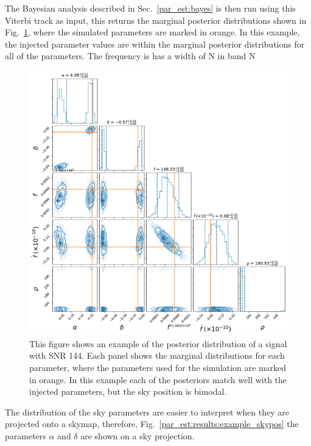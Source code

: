 The Bayesian analysis described in Sec.~\ref{par_est:bayes} is then run using this Viterbi track as input, this returns the marginal posterior distributions shown in Fig.~\ref{par_est:results:example_posterior}, where the simulated parameters are marked in orange.
In this example, the injected parameter values are within the marginal posterior distributions for all of the parameters.
The frequency is has a width of N in band N 
%
\begin{figure}[pt]

    \centering
    \includegraphics[width=\linewidth]{C5_parameter/cornerplot.pdf}
    \caption[KDE of likelihood in different \gls{SNR} ranges]{This figure shows an example of the posterior distribution of a signal with \gls{SNR} 144. Each panel shows the marginal distributions for each parameter, where the parameters used for the simulation are marked in orange. In this example each of the posteriors match well with the injected parameters, but the sky position is bimodal. }
    \label{par_est:results:example_posterior}
    
\end{figure}
%
The distribution of the sky parameters are easier to interpret when they are projected onto a skymap, therefore, Fig.~\ref{par_est:results:example_skypos} the parameters $\alpha$ and $\delta$ are shown on a sky projection.
